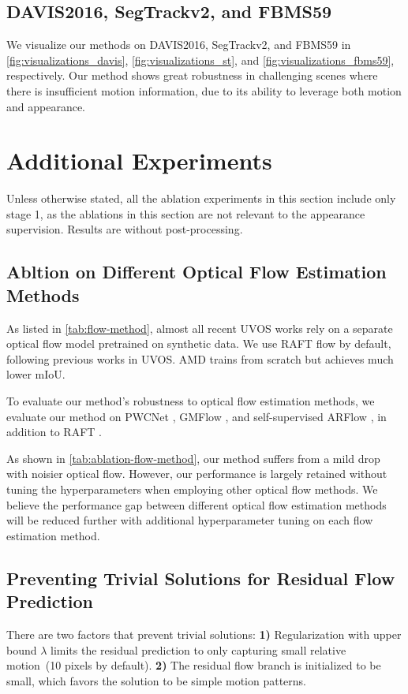 \subsection{DAVIS2016, SegTrackv2, and FBMS59}
We visualize our methods on DAVIS2016, SegTrackv2, and FBMS59 in \cref{fig:visualizations_davis}, \cref{fig:visualizations_st}, and \cref{fig:visualizations_fbms59}, respectively. Our method shows great robustness in challenging scenes where there is insufficient motion information, due to its ability to leverage both motion and appearance.


\section{Additional Experiments}
Unless otherwise stated, all the ablation experiments in this section include only stage 1, as the ablations in this section are not relevant to the appearance supervision. Results are without post-processing.

\subsection{Abltion on Different Optical Flow Estimation Methods}
As listed in \cref{tab:flow-method}, almost all recent UVOS works rely on a separate optical flow model pretrained on synthetic data. We use RAFT \cite{teed2020raft} flow by default, following previous works in UVOS. AMD trains \cite{sun2017pwc} from scratch but achieves much lower mIoU.

To evaluate our method's robustness to optical flow estimation methods, we evaluate our method on PWCNet \cite{sun2017pwc}, GMFlow \cite{xu2022gmflow}, and self-supervised ARFlow \cite{liu2020learning}, in addition to RAFT \cite{teed2020raft}.

As shown in \cref{tab:ablation-flow-method}, our method suffers from a mild drop with noisier optical flow. However, our performance is largely retained without tuning the hyperparameters when employing other optical flow methods. We believe the performance gap between different optical flow estimation methods will be reduced further with additional hyperparameter tuning on each flow estimation method.


\subsection{Preventing Trivial Solutions for Residual Flow Prediction}
There are two factors that prevent trivial solutions: \textbf{1)} Regularization with upper bound $\lambda$ limits the residual prediction to only capturing small relative motion~(10 pixels by default). \textbf{2)} The residual flow branch is initialized to be small, which favors the solution to be simple motion patterns.


